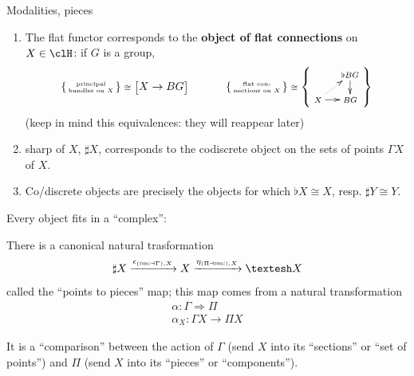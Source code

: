 \documentclass[presentation]{beamer}
\begin{document}
%
%
%
%
%
%
%
\begin{frame}{Modalities, pieces}
  \begin{enumerate}
    \item<+-> The \alert{flat} functor corresponds to the \textbf{object of flat connections} on $X\in \clH$: if $G$ is a group,
    \[\scriptsize
    \left\{
    \begin{smallmatrix}
      \text{principal}\\
      \text{bundles on $X$}
    \end{smallmatrix}
    \right\} \cong \Big[ X \to BG \Big]\qquad\qquad
    \left\{
    \begin{smallmatrix}
      \text{flat con-}\\
      \text{nections on $X$}
    \end{smallmatrix}
    \right\}
    \cong\left\{
    \vcenter{\xymatrix@R=4mm@C=4mm{
    & \flat BG \ar[d]\\
    X \ar[r]\ar@{.>}[ur]& BG
    }}\right\}
    \]
    (keep in mind this equivalences: they will reappear later)
    \item<+-> \alert{sharp} of $X$, $\sharp X$, corresponds to the codiscrete object on the sets of \alert{points} $\Gamma X$ of $X$.
    \item<+-> Co/discrete objects are precisely the objects for which $\flat X \cong X$, resp. $\sharp Y \cong Y$.
  \end{enumerate}
\end{frame}
%
%
%
%
%
%
%
\begin{frame}
  Every object fits in a ``complex'':
  \onslide<+->
  \begin{df}
    There is a canonical natural trasformation
    \[
    \sharp X \xto{\epsilon_{(\disc\dashv\Gamma),X}} X \xto{\eta_{(\Pi\dashv\disc),X}} \shape X
    \]
    called the ``\alert{points to pieces}'' map; \onslide<+-> this map comes from a natural transformation
    \begin{gather*}
      \alpha : \Gamma \Rightarrow \Pi \\ \alpha_X : \Gamma X \to \Pi X
    \end{gather*}
  \end{df}
  \onslide<+->
  It is a ``comparison'' between the action of $\Gamma$ (send $X$ into its ``sections'' or ``set of points'') and $\Pi$ (send $X$ into its ``pieces'' or ``components'').
\end{frame}
%
%
%
%
%
%
%
\end{document}
